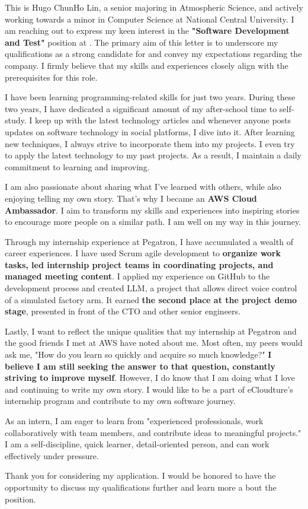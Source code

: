 
This is Hugo ChunHo Lin, a senior majoring in Atmospheric 
Science, and actively working towards a minor in 
Computer Science at National Central University. 
I am reaching out to express my keen interest in 
the \textbf{"Software Development and Test"} position at 
\company. The primary aim of this letter is to 
underscore my qualifications as a strong candidate 
for \company and convey my expectations regarding 
the company. I firmly believe that my skills and 
experiences closely align with the prerequisites 
for this role.

I have been learning programming-related skills for just two years. During these two years, I have dedicated a significant amount of my after-school time to self-study. I keep up with the latest technology articles and whenever anyone posts updates on software technology in social platforms, I dive into it. After learning new techniques, I always strive to incorporate them into my projects. I even try to apply the latest technology to my past projects. As a result, I maintain a daily commitment to learning and improving.

I am also passionate about sharing what I've learned with others, while also enjoying telling my own story. That's why I became an \textbf{AWS Cloud Ambassador}. I aim to transform my skills and experiences into inspiring stories to encourage more people on a similar path. I am well on my way in this journey.

Through my internship experience at Pegatron, I have accumulated a wealth of career experiences. I have used Scrum agile development to \textbf{organize work tasks, led internship project teams in coordinating projects, and managed meeting content}. I applied my experience on GitHub to the development process and created LLM, a project that allows direct voice control of a simulated factory arm. It earned \textbf{the second place at the project demo stage}, presented in front of the CTO and other senior engineers.

Lastly, I want to reflect the unique qualities that my internship at Pegatron and the good friends I met at AWS have noted about me. Most often, my peers would ask me, "How do you learn so quickly and acquire so much knowledge?" \textbf{I believe I am still seeking the answer to that question, constantly striving to improve myself}. However, I do know that I am doing what I love and continuing to write my own story. I would like to be a part of eCloudture's internship program and contribute to my own software journey.

As an intern, I am eager to learn from "experienced professionals, work collaboratively with team members, and contribute ideas to meaningful projects." I am a self-discipline, quick learner, detail-oriented person, and can work effectively under pressure.

Thank you for considering my application. 
I would be honored to have the opportunity to 
discuss my qualifications further and learn more a
bout the position.
